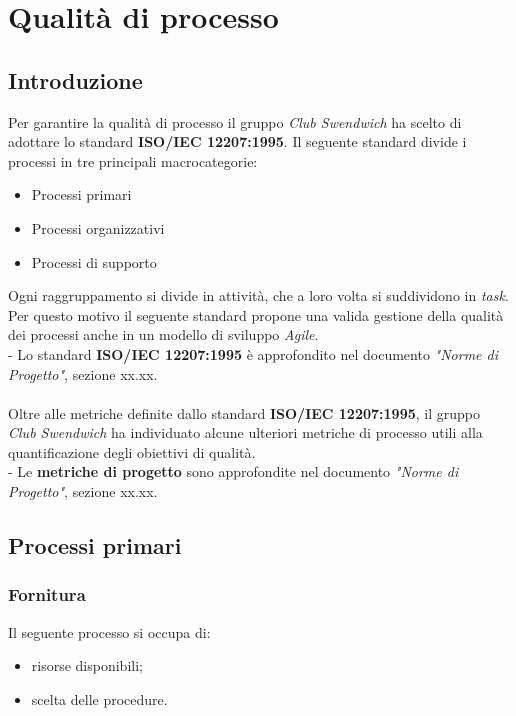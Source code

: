 \section{Qualità di processo}
\subsection{Introduzione}
Per garantire la qualità di processo il gruppo \textit{Club Swendwich} 
ha scelto di adottare lo standard \textbf{ISO/IEC 12207:1995}.
Il seguente standard divide i processi in tre principali macrocategorie:
\begin{itemize}
    \item Processi primari
    \item Processi organizzativi
    \item Processi di supporto
\end{itemize}
Ogni raggruppamento si divide in attività, che a loro volta si suddividono
in \textit{task}.\\
Per questo motivo il seguente standard propone una valida gestione della
qualità dei processi anche in un modello di sviluppo \textit{Agile}.\\
\noindent
- Lo standard \textbf{ISO/IEC 12207:1995} è approfondito nel documento \textit{"Norme di Progetto"},
sezione xx.xx. \\
\\
\noindent
Oltre alle metriche definite dallo standard \textbf{ISO/IEC 12207:1995}, il 
gruppo \textit{Club Swendwich} ha individuato alcune ulteriori metriche
di processo utili alla quantificazione degli obiettivi di qualità.\\
\noindent
- Le \textbf{metriche di progetto} sono approfondite nel documento \textit{"Norme di Progetto"},
sezione xx.xx.

\subsection{Processi primari}
\subsubsection{Fornitura}
Il seguente processo si occupa di:
\begin{itemize}
    \item risorse disponibili;
    \item scelta delle procedure.
\end{itemize}
